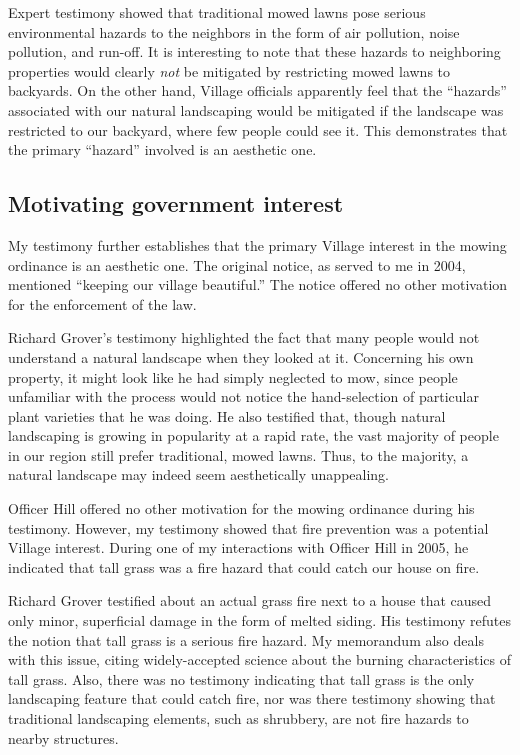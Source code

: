 \documentclass[12pt]{article}
\begin{document}
Expert testimony showed that traditional mowed lawns pose serious environmental hazards to the neighbors in the form of air pollution, noise pollution, and run-off.
It is interesting to note that these hazards to neighboring properties would clearly {\it not} be mitigated by restricting mowed lawns to backyards.
On the other hand, Village officials apparently feel that the ``hazards'' associated with our natural landscaping would be mitigated if the landscape was restricted to our backyard, where few people could see it.
This demonstrates that the primary ``hazard'' involved is an aesthetic one.  

\subsection{Motivating government interest}

My testimony further establishes that the primary Village interest in the mowing ordinance is an aesthetic one.
The original notice, as served to me in 2004, mentioned ``keeping our village beautiful.''
The notice offered no other motivation for the enforcement of the law.

Richard Grover's testimony highlighted the fact that many people would not understand a natural landscape when they looked at it.
Concerning his own property, it might look like he had simply neglected to mow, since people unfamiliar with the process would not notice the hand-selection of particular plant varieties that he was doing.
He also testified that, though natural landscaping is growing in popularity at a rapid rate, the vast majority of people in our region still prefer traditional, mowed lawns.
Thus, to the majority, a natural landscape may indeed seem aesthetically unappealing.

Officer Hill offered no other motivation for the mowing ordinance during his testimony.
However, my testimony showed that fire prevention was a potential Village interest.
During one of my interactions with Officer Hill in 2005, he indicated that tall grass was a fire hazard that could catch our house on fire.

Richard Grover testified about an actual grass fire next to a house that caused only minor, superficial damage in the form of melted siding.
His testimony refutes the notion that tall grass is a serious fire hazard.
My memorandum also deals with this issue, citing widely-accepted science about the burning characteristics of tall grass.
Also, there was no testimony indicating that tall grass is the only landscaping feature that could catch fire, nor was there testimony showing that traditional landscaping elements, such as shrubbery, are not fire hazards to nearby structures. 
\end{document}
